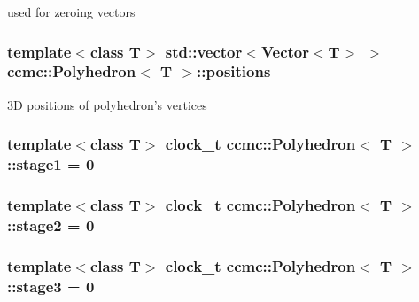 used for zeroing vectors 

\hypertarget{classccmc_1_1_polyhedron_a41195440d2192a6118e2990f09183179}{
\subsubsection[{positions}]{\setlength{\rightskip}{0pt plus 5cm}template$<$class T$>$ std\-::vector$<${\bf Vector}$<$T$>$ $>$ {\bf ccmc\-::\-Polyhedron}$<$ T $>$\-::positions}}\label{classccmc_1_1_polyhedron_a41195440d2192a6118e2990f09183179}
3\-D positions of polyhedron's vertices \hypertarget{classccmc_1_1_polyhedron_aacd29b2b3045dbbc36ef47db91054d48}{
\subsubsection[{stage1}]{\setlength{\rightskip}{0pt plus 5cm}template$<$class T$>$ clock\-\_\-t {\bf ccmc\-::\-Polyhedron}$<$ T $>$\-::stage1 = 0\hspace{0.3cm}{\ttfamily [static]}}}\label{classccmc_1_1_polyhedron_aacd29b2b3045dbbc36ef47db91054d48}
\hypertarget{classccmc_1_1_polyhedron_adb2d70dc6f7af2654dd668bb3940caac}{
\subsubsection[{stage2}]{\setlength{\rightskip}{0pt plus 5cm}template$<$class T$>$ clock\-\_\-t {\bf ccmc\-::\-Polyhedron}$<$ T $>$\-::stage2 = 0\hspace{0.3cm}{\ttfamily [static]}}}\label{classccmc_1_1_polyhedron_adb2d70dc6f7af2654dd668bb3940caac}
\hypertarget{classccmc_1_1_polyhedron_a47a9b8072039bf50deb15bffb7827012}{
\subsubsection[{stage3}]{\setlength{\rightskip}{0pt plus 5cm}template$<$class T$>$ clock\-\_\-t {\bf ccmc\-::\-Polyhedron}$<$ T $>$\-::stage3 = 0\hspace{0.3cm}{\ttfamily [static]}}}\label{classccmc_1_1_polyhedron_a47a9b8072039bf50deb15bffb7827012}
